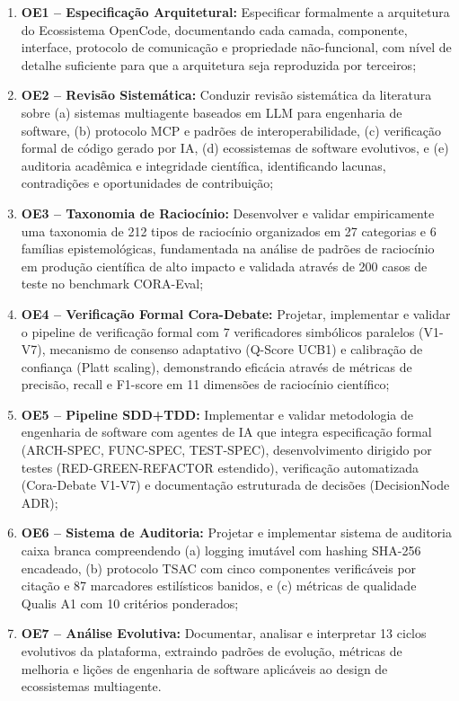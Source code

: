 \documentclass[12pt,a4paper,sumario=tradicional,openany]{abntex2}
\begin{document}
\begin{enumerate}[leftmargin=*]
    \item \textbf{OE1 -- Especificação Arquitetural:} Especificar formalmente a arquitetura do Ecossistema OpenCode, documentando cada camada, componente, interface, protocolo de comunicação e propriedade não-funcional, com nível de detalhe suficiente para que a arquitetura seja reproduzida por terceiros;
    
    \item \textbf{OE2 -- Revisão Sistemática:} Conduzir revisão sistemática da literatura sobre (a) sistemas multiagente baseados em LLM para engenharia de software, (b) protocolo MCP e padrões de interoperabilidade, (c) verificação formal de código gerado por IA, (d) ecossistemas de software evolutivos, e (e) auditoria acadêmica e integridade científica, identificando lacunas, contradições e oportunidades de contribuição;
    
    \item \textbf{OE3 -- Taxonomia de Raciocínio:} Desenvolver e validar empiricamente uma taxonomia de 212 tipos de raciocínio organizados em 27 categorias e 6 famílias epistemológicas, fundamentada na análise de padrões de raciocínio em produção científica de alto impacto e validada através de 200 casos de teste no benchmark CORA-Eval;
    
    \item \textbf{OE4 -- Verificação Formal Cora-Debate:} Projetar, implementar e validar o pipeline de verificação formal com 7 verificadores simbólicos paralelos (V1-V7), mecanismo de consenso adaptativo (Q-Score UCB1) e calibração de confiança (Platt scaling), demonstrando eficácia através de métricas de precisão, recall e F1-score em 11 dimensões de raciocínio científico;
    
    \item \textbf{OE5 -- Pipeline SDD+TDD:} Implementar e validar metodologia de engenharia de software com agentes de IA que integra especificação formal (ARCH-SPEC, FUNC-SPEC, TEST-SPEC), desenvolvimento dirigido por testes (RED-GREEN-REFACTOR estendido), verificação automatizada (Cora-Debate V1-V7) e documentação estruturada de decisões (DecisionNode ADR);
    
    \item \textbf{OE6 -- Sistema de Auditoria:} Projetar e implementar sistema de auditoria caixa branca compreendendo (a) logging imutável com hashing SHA-256 encadeado, (b) protocolo TSAC com cinco componentes verificáveis por citação e 87 marcadores estilísticos banidos, e (c) métricas de qualidade Qualis A1 com 10 critérios ponderados;
    
    \item \textbf{OE7 -- Análise Evolutiva:} Documentar, analisar e interpretar 13 ciclos evolutivos da plataforma, extraindo padrões de evolução, métricas de melhoria e lições de engenharia de software aplicáveis ao design de ecossistemas multiagente.
\end{enumerate}
\end{document}

